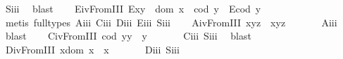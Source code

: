 \begin{isabellebody}
%
\isatagproof
{}\isamarkupfalse%
\ S\isactrlsub i\isactrlsub i\isactrlsub i\ \isamarkupfalse%
\ blast%
\endisatagproof
{\isafoldproof}%
%
\isadelimproof
\isanewline
%
\endisadelimproof
\ \ \isamarkupfalse%
\ E\isactrlsub i\isactrlsub vFromIII{\isacharcolon}\ {\isachardoublequoteopen}E{\isacharparenleft}x{\isasymcdot}y{\isacharparenright}\ \isactrlbold {\isasymleftrightarrow}\ {\isacharparenleft}dom\ x\ {\isasymcong}\ cod\ y\ \isactrlbold {\isasymand}\ E{\isacharparenleft}cod\ y{\isacharparenright}{\isacharparenright}{\isachardoublequoteclose}\ \isanewline
%
\isadelimproof
\ \ \ \ %
\endisadelimproof
%
\isatagproof
{}\isamarkupfalse%
\ {\isacharparenleft}metis\ {\isacharparenleft}full{\isacharunderscore}types{\isacharparenright}\ A\isactrlsub i\isactrlsub i\isactrlsub i\ C\isactrlsub i\isactrlsub i\isactrlsub i\ D\isactrlsub i\isactrlsub i\isactrlsub i\ E\isactrlsub i\isactrlsub i\isactrlsub i\ S\isactrlsub i\isactrlsub i\isactrlsub i{\isacharparenright}%
\endisatagproof
{\isafoldproof}%
%
\isadelimproof
\isanewline
%
\endisadelimproof
\ \ \isamarkupfalse%
\ A\isactrlsub i\isactrlsub vFromIII{\isacharcolon}\ {\isachardoublequoteopen}x{\isasymcdot}{\isacharparenleft}y{\isasymcdot}z{\isacharparenright}\ {\isasymcong}\ {\isacharparenleft}x{\isasymcdot}y{\isacharparenright}{\isasymcdot}z{\isachardoublequoteclose}\ \isanewline
%
\isadelimproof
\ \ \ \ %
\endisadelimproof
%
\isatagproof
{}\isamarkupfalse%
\ A\isactrlsub i\isactrlsub i\isactrlsub i\ \isamarkupfalse%
\ blast%
\endisatagproof
{\isafoldproof}%
%
\isadelimproof
\isanewline
%
\endisadelimproof
\ \ \isamarkupfalse%
\ C\isactrlsub i\isactrlsub vFromIII{\isacharcolon}\ {\isachardoublequoteopen}{\isacharparenleft}cod\ y{\isacharparenright}{\isasymcdot}y\ {\isasymcong}\ y{\isachardoublequoteclose}\ \isanewline
%
\isadelimproof
\ \ \ \ %
\endisadelimproof
%
\isatagproof
{}\isamarkupfalse%
\ C\isactrlsub i\isactrlsub i\isactrlsub i\ S\isactrlsub i\isactrlsub i\isactrlsub i\ \isamarkupfalse%
\ blast%
\endisatagproof
{\isafoldproof}%
%
\isadelimproof
\isanewline
%
\endisadelimproof
\ \ \isamarkupfalse%
\ D\isactrlsub i\isactrlsub vFromIII{\isacharcolon}\ {\isachardoublequoteopen}x{\isasymcdot}{\isacharparenleft}dom\ x{\isacharparenright}\ {\isasymcong}\ x{\isachardoublequoteclose}\ \isanewline
%
\isadelimproof
\ \ \ \ %
\endisadelimproof
%
\isatagproof
{}\isamarkupfalse%
\ D\isactrlsub i\isactrlsub i\isactrlsub i\ S\isactrlsub i\isactrlsub i\isactrlsub i\ \isamarkupfalse%

\end{isabellebody}
